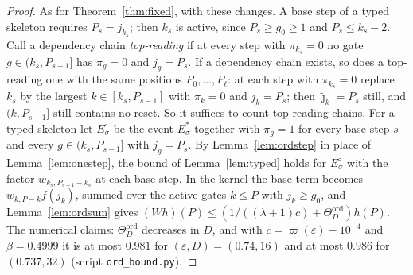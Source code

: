 \documentclass[11pt]{amsart}
\theoremstyle{definition}
\theoremstyle{remark}
\newcommand{\eps}{\varepsilon}
\newcommand{\jt}{\tilde{\jmath}}
\begin{document}
\begin{proof}
As for Theorem~\ref{thm:fixed}, with these changes. A base step of a typed skeleton requires
$P_s=j_{k_s}$; then $k_s$ is active, since $P_s\ge g_0\ge1$ and $P_s\le k_s-2$. Call a dependency
chain \emph{top-reading} if at every step with $\pi_{k_s}=0$ no gate $g\in(k_s,P_{s-1}]$ has
$\pi_g=0$ and $j_g=P_s$. If a dependency chain exists, so does a top-reading one with the same
positions $P_0,\dots,P_\ell$: at each step with $\pi_{k_s}=0$ replace $k_s$ by the largest
$k\in[k_s,P_{s-1}]$ with $\pi_k=0$ and $j_k=P_s$; then $\jt_k=P_s$ still, and $(k,P_{s-1}]$ still
contains no reset. So it suffices to count top-reading chains. For a typed skeleton let
$E^{\circ}_\sigma$ be the event $E^*_\sigma$ together with $\pi_g=1$ for every base step $s$ and
every $g\in(k_s,P_{s-1}]$ with $j_g=P_s$. By Lemma~\ref{lem:ordstep} in place of
Lemma~\ref{lem:onestep}, the bound of Lemma~\ref{lem:typed} holds for $E^{\circ}_\sigma$ with the
factor $w_{k_s,P_{s-1}-k_s}$ at each base step. In the kernel the base term becomes
$w_{k,P-k}f(j_k)$, summed over the active gates $k\le P$ with $j_k\ge g_0$, and
Lemma~\ref{lem:ordsum} gives $(W h)(P)\le(1/((\lambda+1)c)+\Theta^{\mathrm{ord}}_D)h(P)$. The
numerical claims: $\Theta^{\mathrm{ord}}_D$ decreases in $D$, and with $c=\varpi(\eps)-10^{-4}$ and
$\beta=0.4999$ it is at most $0.981$ for $(\eps,D)=(0.74,16)$ and at most $0.986$ for
$(0.737,32)$ (script \texttt{ord\_bound.py}).
\end{proof}
\end{document}

